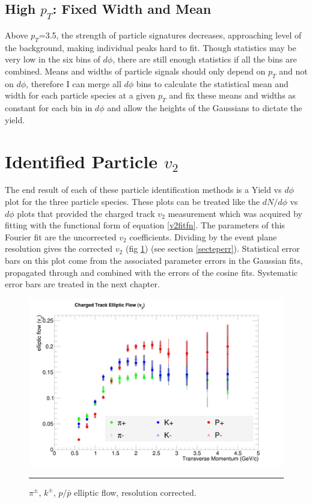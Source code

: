 \subsection{High $p_T$: Fixed Width and Mean}
Above $p_T$=3.5, the strength of particle signatures decreases, approaching level of the background, making individual peaks hard to fit. Though statistics may be very low in the six bins of $d\phi$, there are still enough statistics if all the bins are combined. Means and widths of particle signals should only depend on $p_T$ and not on $d\phi$, therefore I can merge all $d\phi$ bins to calculate the statistical mean and width for each particle species at a given $p_T$ and fix these means and widths as constant for each bin in $d\phi$ and allow the heights of the Gaussians to dictate the yield.

\section{Identified Particle $v_{2}$}
The end result of each of these particle identification methods is a Yield vs $d\phi$ plot for the three particle species. These plots can be treated like the $dN/d\phi$ vs $d\phi$ plots that provided the charged track $v_2$ measurement which was acquired by fitting with the functional form of equation \ref{v2fitfn}. The parameters of this Fourier fit are the uncorrected $v_2$ coefficients. Dividing by the event plane resolution gives the corrected $v_2$ (fig \ref{fig:v2all}) (see section \ref{secteperr}). Statistical error bars on this plot come from the associated parameter errors in the Gaussian fits, propagated through and combined with the errors of the cosine fits. Systematic error bars are treated in the next chapter.

\begin{figure}[htbp!]
  \centering
    \includegraphics[width=1\textwidth]{v2all.jpg}
    \rule{35em}{0.5pt}
  \caption[$\pi^{\pm}$, $k^{\pm}$, $p/\bar{p}$ elliptic flow,$\sqrt{s_{NN}}=$200 GeV d+Au collisions]{$\pi^{\pm}$, $k^{\pm}$, $p/\bar{p}$ elliptic flow, resolution corrected.}
  \label{fig:v2all}
\end{figure}

\pagebreak
\pagebreak

